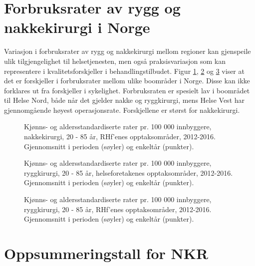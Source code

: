 \documentclass [norsk,a4paper,twoside]{article}\usepackage[]{graphicx}\usepackage[]{color}
\begin{document}
\section{Forbruksrater av rygg og nakkekirurgi i Norge}
Variasjon i forbruksrater av rygg og nakkekirurgi mellom regioner kan 
gjenspeile ulik tilgjengelighet til helsetjenesten, men også praksisvariasjon som kan
representere i kvalitetsforskjeller i behandlingstilbudet. Figur \ref{fig:AA_Nakkekirurgi_BoRHF1}, \ref{fig:AA_Ryggkirurgi_BoHF1} og \ref{fig:AA_Ryggkirurgi_BoRHF1} viser at det
er forskjeller i forbruksrater mellom ulike boområder i Norge. Disse kan ikke
forklares ut fra forskjeller i sykelighet. Forbruksraten er spesielt lav i boområdet til
Helse Nord, både når det gjelder nakke og ryggkirurgi, mens Helse Vest har gjennomgående høyest operasjonsrate. Forskjellene er størst for nakkekirurgi.

\begin{figure}[ht]
\caption{Kjønns- og aldersstandardiserte rater pr. 100 000 innbyggere, nakkekirurgi, 20 - 85 år, RHf’enes opptaksområder, 2012-2016. Gjennomsnitt i perioden (søyler) og enkeltår (punkter).}
\label{fig:AA_Nakkekirurgi_BoRHF1}
\end{figure}

\begin{figure}[ht]
\caption{Kjønns- og aldersstandardiserte rater pr. 100 000 innbyggere, ryggkirurgi, 20 - 85 år, helseforetakenes opptaksområder, 2012-2016. Gjennomsnitt i perioden (søyler) og enkeltår (punkter).}
\label{fig:AA_Ryggkirurgi_BoHF1}
\end{figure}

\begin{figure}[ht]
\caption{Kjønns- og aldersstandardiserte rater pr. 100 000 innbyggere, ryggkirurgi, 20 - 85 år, RHf’enes opptaksområder, 2012-2016. Gjennomsnitt i perioden (søyler) og enkeltår (punkter).}
\label{fig:AA_Ryggkirurgi_BoRHF1}
\end{figure}

\clearpage



\section{Oppsummeringstall for NKR}
\end{document}
